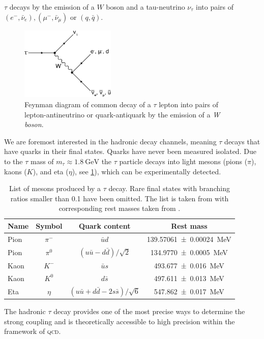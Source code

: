 \documentclass[../../index.tex]{subfiles}
\begin{document}
\(\tau\) decays by the emission of a \(W\) boson and a tau-neutrino \(\nu_\tau\)
into pairs of \((e^-, \bar\nu_e), (\mu^-, \bar\nu_\mu)\) or \((q, \bar q)\).
\begin{figure}
  \centering \includegraphics[width=0.4\textwidth]{images/tauDecay.eps}
  \caption{Feynman diagram of common decay of a \(\tau\) lepton into pairs of
    lepton-antineutrino or quark-antiquark by the emission of a \textit{W
      boson}.}
  \label{fig:tauDecay}
\end{figure}
We are foremost interested in the hadronic decay channels, meaning \(\tau\)
decays that have quarks in their final states. Quarks have never been measured
isolated. Due to the \(\tau\) mass of \(m_\tau \approx
\SI{1.8}{\giga\electronvolt}\) the \(\tau\) particle decays into light mesons
(pions (\(\pi\)), kaons (\(K\)), and eta (\(\eta\)), see
\cref{table:lightMesons}), which can be experimentally detected.
\begin{table}
  \centering
  \begin{tabular}{lccc}
    \toprule
    Name & Symbol & Quark content & Rest mass \\
    \midrule
    Pion & \(\pi^-\) & \(\bar u d\) & \SI{139.57061 \pm 0.00024}{\mega\eV}  \\
    Pion & \(\pi^0\) & \((u \bar u - d \bar d)/\sqrt{2}\) & \SI{134.9770\pm0.0005}{\mega\eV} \\
    Kaon & \(K^-\) & \(\bar u s\) & \SI{493.677\pm0.016}{\mega\eV} \\
    Kaon & \(K^0\) & \(d \bar s\) & \SI{497.611\pm0.013}{\mega\eV} \\
    Eta & \(\eta\) & \((u \bar u + d \bar d - 2 s \bar s)/\sqrt{6}\) & \SI{547.862\pm0.017}{\mega\eV} \\
  \end{tabular}
  \caption{List of mesons produced by a \(\tau\) decay. Rare final states with
    branching ratios smaller than 0.1 have been omitted. The list is taken from
    \cite{Davier2006} with corresponding rest masses taken from \cite{PDG2018}.}
  \label{table:lightMesons}
\end{table}
The hadronic \(\tau\) decay provides one of the most precise ways to determine
the strong coupling \cite{Pich2016} and is theoretically accessible to high
precision within the framework of \textsc{qcd}.
\end{document}

